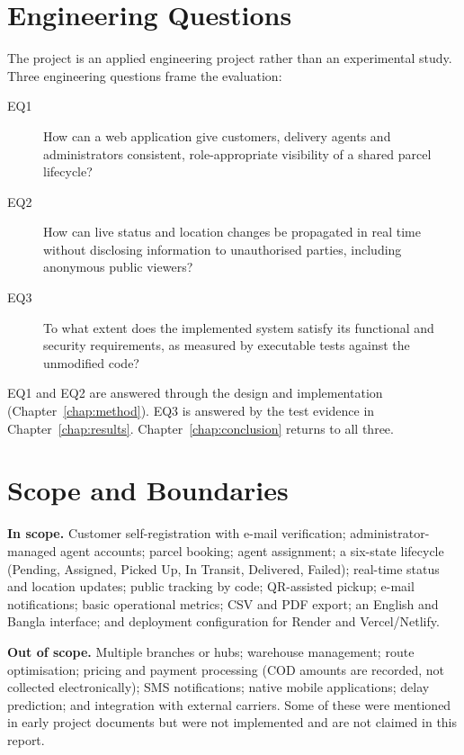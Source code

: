 \section{Engineering Questions}
\label{sec:questions}

The project is an applied engineering project rather than an experimental study. Three engineering questions frame the evaluation:

\begin{description}
  \item[EQ1] How can a web application give customers, delivery agents and administrators consistent, role-appropriate visibility of a shared parcel lifecycle?
  \item[EQ2] How can live status and location changes be propagated in real time without disclosing information to unauthorised parties, including anonymous public viewers?
  \item[EQ3] To what extent does the implemented system satisfy its functional and security requirements, as measured by executable tests against the unmodified code?
\end{description}

EQ1 and EQ2 are answered through the design and implementation (Chapter~\ref{chap:method}). EQ3 is answered by the test evidence in Chapter~\ref{chap:results}. Chapter~\ref{chap:conclusion} returns to all three.

\section{Scope and Boundaries}
\label{sec:scope}

\textbf{In scope.} Customer self-registration with e-mail verification; administrator-managed agent accounts; parcel booking; agent assignment; a six-state lifecycle (Pending, Assigned, Picked Up, In Transit, Delivered, Failed); real-time status and location updates; public tracking by code; QR-assisted pickup; e-mail notifications; basic operational metrics; CSV and PDF export; an English and Bangla interface; and deployment configuration for Render and Vercel/Netlify.

\textbf{Out of scope.} Multiple branches or hubs; warehouse management; route optimisation; pricing and payment processing (COD amounts are recorded, not collected electronically); SMS notifications; native mobile applications; delay prediction; and integration with external carriers. Some of these were mentioned in early project documents but were not implemented and are not claimed in this report.

